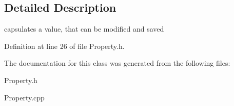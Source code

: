 \subsection{Detailed Description}
capsulates a value, that can be modified and saved 

Definition at line 26 of file Property.\-h.



The documentation for this class was generated from the following files\-:\begin{DoxyCompactItemize}
\item 
Property.\-h\item 
Property.\-cpp\end{DoxyCompactItemize}
